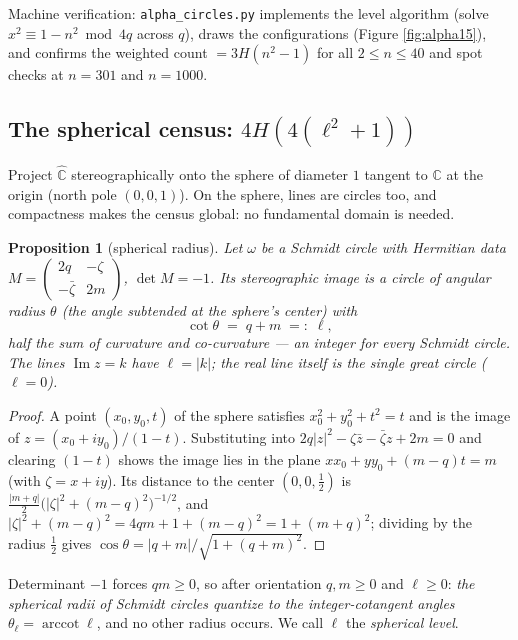 \documentclass[11pt]{amsart}
\numberwithin{equation}{section}
\theoremstyle{plain}
\newtheorem{proposition}[theorem]{Proposition}
\theoremstyle{definition}
\theoremstyle{remark}
\newcommand{\C}{\mathbb{C}}
\newcommand{\Chat}{\widehat{\C}}
\newcommand{\im}{\operatorname{Im}}
\newcommand{\arccot}{\operatorname{arccot}}
\begin{document}
Machine verification: \texttt{alpha\_circles.py} implements the level
algorithm (solve $x^2 \equiv 1 - n^2 \bmod 4q$ across $q$), draws the
configurations (Figure \ref{fig:alpha15}), and confirms the weighted
count $= 3H(n^2 - 1)$ for all $2 \le n \le 40$ and spot checks at
$n = 301$ and $n = 1000$.

\subsection{The spherical census: $4H(4(\ell^2 + 1))$}
\label{subsec:sph-count}

Project $\Chat$ stereographically onto the sphere of diameter $1$
tangent to $\C$ at the origin (north pole $(0, 0, 1)$).  On the sphere,
lines are circles too, and compactness makes the census global: no
fundamental domain is needed.

\begin{proposition}[spherical radius]\label{prop:sphradius}
Let $\omega$ be a Schmidt circle with Hermitian data
$M = \begin{pmatrix} 2q & -\zeta \\ -\bar\zeta & 2m \end{pmatrix}$,
$\det M = -1$.  Its stereographic image is a circle of angular radius
$\theta$ (the angle subtended at the sphere's center) with
\[
  \cot\theta \;=\; q + m \;=:\; \ell,
\]
half the sum of curvature and co-curvature --- an integer for every
Schmidt circle.  The lines $\im z = k$ have $\ell = |k|$; the real line
itself is the single great circle ($\ell = 0$).
\end{proposition}

\begin{proof}
A point $(x_0, y_0, t)$ of the sphere satisfies
$x_0^2 + y_0^2 + t^2 = t$ and is the image of $z = (x_0 + iy_0)/(1-t)$.
Substituting into $2q|z|^2 - \zeta\bar z - \bar\zeta z + 2m = 0$ and
clearing $(1 - t)$ shows the image lies in the plane
$x x_0 + y y_0 + (m - q)t = m$ (with $\zeta = x + iy$).  Its distance to
the center $(0, 0, \tfrac12)$ is
$\tfrac{|m + q|}{2}\bigl(|\zeta|^2 + (m - q)^2\bigr)^{-1/2}$, and
$|\zeta|^2 + (m - q)^2 = 4qm + 1 + (m - q)^2 = 1 + (m + q)^2$; dividing
by the radius $\tfrac12$ gives
$\cos\theta = |q + m|/\sqrt{1 + (q + m)^2}$.
\end{proof}

Determinant $-1$ forces $qm \ge 0$, so after orientation $q, m \ge 0$
and $\ell \ge 0$: \emph{the spherical radii of Schmidt circles quantize
to the integer-cotangent angles} $\theta_\ell = \arccot\ell$, and no
other radius occurs.  We call $\ell$ the \emph{spherical level}.
\end{document}
